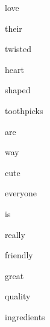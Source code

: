 \documentclass[varwidth]{standalone}
\begin{document}
 \begin{CJK*}{UTF8}{gbsn} 
{\setlength{\fboxsep}{0pt}\colorbox{white!0}{\parbox{0.9\textwidth}{
\colorbox{red!0.15159010887145996}{\strut love} 
\colorbox{red!99.62337493896484}{\strut their} 
\colorbox{red!6.769280910491943}{\strut twisted} 
\colorbox{red!67.17536163330078}{\strut heart} 
\colorbox{red!0.0}{\strut shaped} 
\colorbox{red!24.16758155822754}{\strut toothpicks} 
\colorbox{red!100.0}{\strut are} 
\colorbox{red!5.062044620513916}{\strut way} 
\colorbox{red!91.87262725830078}{\strut cute} 
\colorbox{red!15.977792739868164}{\strut everyone} 
\colorbox{red!59.457427978515625}{\strut is} 
\colorbox{red!51.766883850097656}{\strut really} 
\colorbox{red!30.815160751342773}{\strut friendly} 
\colorbox{red!36.91262435913086}{\strut great} 
\colorbox{red!21.046424865722656}{\strut quality} 
\colorbox{red!18.183557510375977}{\strut ingredients} 

}}}\end{CJK*}
\end{document}
